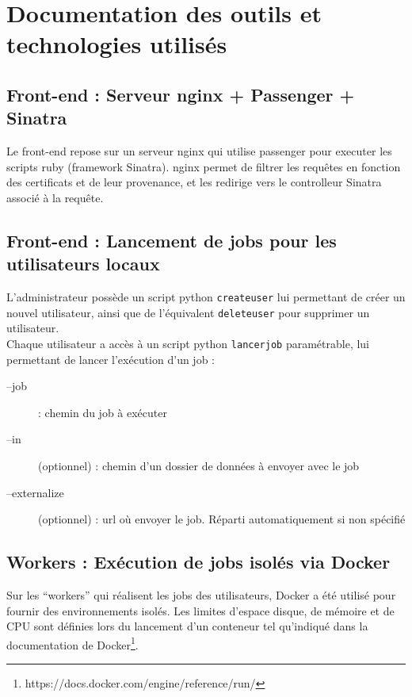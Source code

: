 \newpage

\chapter{Documentation des outils et technologies utilisés}

\section{Front-end : Serveur nginx + Passenger + Sinatra}

Le front-end repose sur un serveur nginx qui utilise passenger pour executer les scripts ruby (framework Sinatra).
nginx permet de filtrer les requêtes en fonction des certificats et de leur provenance, et les redirige vers le controlleur Sinatra associé à la requête.

\section{Front-end : Lancement de jobs pour les utilisateurs locaux} 

L'administrateur possède un script python {\tt createuser} lui permettant de créer un nouvel utilisateur, ainsi que de l'équivalent {\tt deleteuser} pour supprimer un utilisateur. \\

Chaque utilisateur a accès à un script python {\tt lancerjob} paramétrable, lui permettant de lancer l'exécution d'un job :\\
\begin{description}
	\item[--job] : chemin du job à exécuter
	\item[--in] (optionnel) : chemin d'un dossier de données à envoyer avec le job
	\item[--externalize] (optionnel) : url où envoyer le job. Réparti automatiquement si non spécifié
\end{description}

\section{Workers : Exécution de jobs isolés via Docker}

Sur les ``workers'' qui réalisent les jobs des utilisateurs, Docker a été utilisé pour fournir des environnements
isolés. Les limites d'espace disque, de mémoire et de CPU sont définies lors du lancement d'un conteneur tel qu'indiqué
dans la documentation de Docker\footnote{https://docs.docker.com/engine/reference/run/}.


